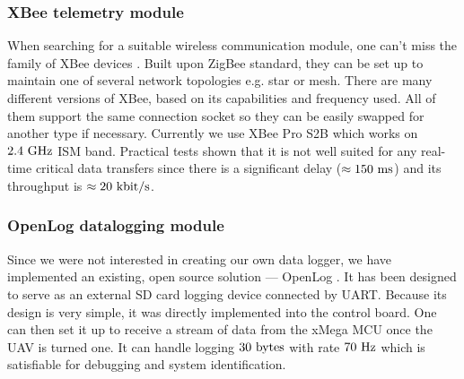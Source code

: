 \subsubsection{XBee telemetry module}

When searching for a suitable wireless communication module, one can't miss the family of XBee devices \citep{xbee}. Built upon ZigBee standard, they can be set up to maintain one of several network topologies e.g. star or mesh. There are many different versions of XBee, based on its capabilities and frequency used. All of them support the same connection socket so they can be easily swapped for another type if necessary. Currently we use XBee Pro S2B which works on $2.4~\mathrm{GHz}$ ISM band. Practical tests shown that it is not well suited for any real-time critical data transfers since there is a significant delay ($\approx 150~\mathrm{ms}$)  and its throughput is $\approx 20~\mathrm{kbit/s}$.

\subsubsection{OpenLog datalogging module}

Since we were not interested in creating our own data logger, we have implemented an existing, open source solution --- OpenLog \citep{openlog}. It has been designed to serve as an external SD card logging device connected by UART. Because its design is very simple, it was directly implemented into the control board. One can then set it up to receive a stream of data from the xMega MCU once the UAV is turned one. It can handle logging $30~\mathrm{bytes}$ with rate $70~\mathrm{Hz}$ which is satisfiable for debugging and system identification.


\usetikzlibrary{shapes.geometric,backgrounds,calc}

